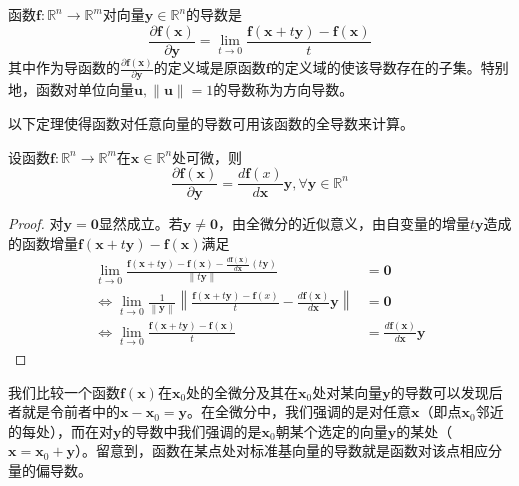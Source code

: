\documentclass[main.tex]{subfiles}
\begin{document}
\begin{definition}
函数$\mathbf{f}:\mathbb{R}^n\rightarrow\mathbb{R}^m$对向量$\mathbf{y}\in\mathbb{R}^n$的导数是
\[\frac{\partial\mathbf{f}\left(\mathbf{x}\right)}{\partial\mathbf{y}}=\lim_{t\to 0}\frac{\mathbf{f}\left(\mathbf{x}+t\mathbf{y}\right)-\mathbf{f}\left(\mathbf{x}\right)}{t}\]
其中作为导函数的$\frac{\partial \mathbf{f}\left(\mathbf{x}\right)}{\partial\mathbf{y}}$的定义域是原函数$\mathbf{f}$的定义域的使该导数存在的子集。特别地，函数对单位向量$\mathbf{u},\left\|\mathbf{u}\right\|=1$的导数称为方向导数。
\end{definition}

以下定理使得函数对任意向量的导数可用该函数的全导数来计算。

\begin{theorem}\label{thm:II.12.6}
设函数$\mathbf{f}:\mathbb{R}^n\rightarrow\mathbb{R}^m$在$\mathbf{x}\in\mathbb{R}^n$处可微，则
\[\frac{\partial\mathbf{f}\left(\mathbf{x}\right)}{\partial\mathbf{y}}=\frac{d\mathbf{f}\left(x\right)}{d\mathbf{x}}\mathbf{y},\forall\mathbf{y}\in\mathbb{R}^n\]
\end{theorem}
\begin{proof}
对$\mathbf{y}=\mathbf{0}$显然成立。若$\mathbf{y}\neq\mathbf{0}$，由全微分的近似意义，由自变量的增量$t\mathbf{y}$造成的函数增量$\mathbf{f}\left(\mathbf{x}+t\mathbf{y}\right)-\mathbf{f}\left(\mathbf{x}\right)$满足
\begin{align*}
\lim_{t\to 0}\frac{\mathbf{f}\left(\mathbf{x}+t\mathbf{y}\right)-\mathbf{f}\left(\mathbf{x}\right)-\frac{d\mathbf{f}\left(\mathbf{x}\right)}{d\mathbf{x}}\left(t\mathbf{y}\right)}{\left\|t\mathbf{y}\right\|}&=\mathbf{0}\\
\Leftrightarrow\lim_{t\to 0}\frac{1}{\left\|\mathbf{y}\right\|}\left\|\frac{\mathbf{f}\left(\mathbf{x}+t\mathbf{y}\right)-\mathbf{f}\left(x\right)}{t}-\frac{d\mathbf{f}\left(\mathbf{x}\right)}{d\mathbf{x}}\mathbf{y}\right\|&=\mathbf{0}\\
\Leftrightarrow\lim_{t\to 0}\frac{\mathbf{f}\left(\mathbf{x}+t\mathbf{y}\right)-\mathbf{f}\left(\mathbf{x}\right)}{t}&=\frac{d\mathbf{f}\left(\mathbf{x}\right)}{d\mathbf{x}}\mathbf{y}
\end{align*}
\end{proof}

我们比较一个函数$\mathbf{f}\left(\mathbf{x}\right)$在$\mathbf{x}_0$处的全微分及其在$\mathbf{x}_0$处对某向量$\mathbf{y}$的导数可以发现后者就是令前者中的$\mathbf{x}-\mathbf{x}_0=\mathbf{y}$。在全微分中，我们强调的是对任意$\mathbf{x}$（即点$\mathbf{x}_0$邻近的每处），而在对$\mathbf{y}$的导数中我们强调的是$\mathbf{x}_0$朝某个选定的向量$\mathbf{y}$的某处（$\mathbf{x}=\mathbf{x}_0+\mathbf{y}$）。留意到，函数在某点处对标准基向量的导数就是函数对该点相应分量的偏导数。
\end{document}
